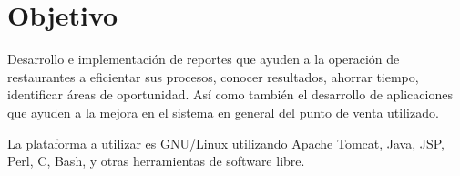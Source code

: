
\chapter{Objetivo}

\label{chap:objetivo}

Desarrollo e implementación de reportes que ayuden a la operación de restaurantes a eficientar sus procesos, conocer resultados, ahorrar tiempo, identificar áreas de oportunidad. Así como también el desarrollo de aplicaciones que ayuden a la mejora en el sistema en general del punto de venta utilizado.

La plataforma a utilizar es GNU/Linux utilizando Apache Tomcat, Java, JSP, Perl, C, Bash, y otras herramientas de software libre.